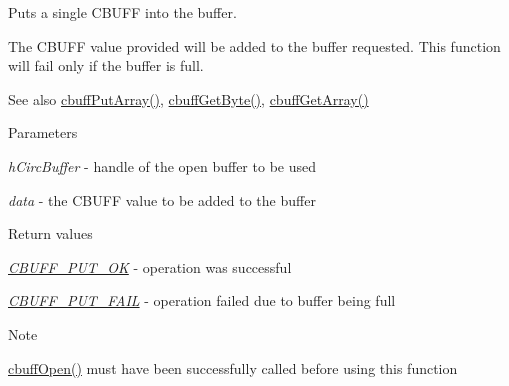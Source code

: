 Puts a single CBUFF into the buffer. 

The CBUFF value provided will be added to the buffer requested. This function will fail only if the buffer is full.

\begin{DoxySeeAlso}{See also}
\hyperlink{group___c_b_u_f_fput_get_functions_ga96aa549fceaf66b586b1527d59715092}{cbuffPutArray()}, \hyperlink{group___c_b_u_f_fput_get_functions_gafef77f05cad83c77f2a52e2e7477e3bc}{cbuffGetByte()}, \hyperlink{group___c_b_u_f_fput_get_functions_ga910285aaa6134396f061ab0e7031e826}{cbuffGetArray()}
\end{DoxySeeAlso}

\begin{DoxyParams}{Parameters}
\item[{\em hCircBuffer}]-\/ handle of the open buffer to be used \item[{\em data}]-\/ the CBUFF value to be added to the buffer\end{DoxyParams}

\begin{DoxyRetVals}{Return values}
\item[{\em \hyperlink{cbuff_8h_a148976599d104ae1b1af2445c017a6d2}{CBUFF\_\-PUT\_\-OK}}]-\/ operation was successful \item[{\em \hyperlink{cbuff_8h_a5b026220aaf3feea98db7746d2fd5438}{CBUFF\_\-PUT\_\-FAIL}}]-\/ operation failed due to buffer being full\end{DoxyRetVals}
\begin{DoxyNote}{Note}

\begin{DoxyEnumerate}
\item \hyperlink{group___c_b_u_f_fopen_c_lose_functions_ga4b124282950602630a84fb4dded3f452}{cbuffOpen()} must have been successfully called before using this function 
\end{DoxyEnumerate}
\end{DoxyNote}
